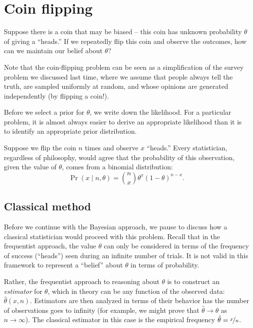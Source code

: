 \documentclass{article}
\newcommand{\given}{\mid}
\begin{document}
\section*{Coin flipping}

Suppose there is a coin that may be biased -- this coin has unknown
probability $\theta$ of giving a ``heads.''  If we repeatedly flip
this coin and observe the outcomes, how can we maintain our belief
about $\theta$?

Note that the coin-flipping problem can be seen as a simplification of
the survey problem we discussed last time, where we assume that people
always tell the truth, are sampled uniformly at random, and whose
opinions are generated independently (by flipping a coin!).

Before we select a prior for $\theta$, we write down the likelihood.
For a particular problem, it is almost always easier to derive an
appropriate likelihood than it is to identify an appropriate prior
distribution.

Suppose we flip the coin $n$ times and observe $x$ ``heads.''  Every
statistician, regardless of philosophy, would agree that the
probability of this observation, given the value of $\theta$, comes
from a binomial distribution:
\begin{equation*}
  \Pr(x \given n, \theta)
  =
  \binom{n}{x} \theta^x (1 - \theta)^{n - x}.
\end{equation*}

\subsection*{Classical method}

Before we continue with the Bayesian approach, we pause to discuss how
a classical statistician would proceed with this problem.  Recall that
in the frequentist approach, the value $\theta$ can only be considered
in terms of the frequency of success (``heads'') seen during an
infinite number of trials.  It is not valid in this framework to represent
a ``belief'' about $\theta$ in terms of probability.

Rather, the frequentist approach to reasoning about $\theta$ is to
construct an \emph{estimator} for $\theta$, which in theory can be any
function of the observed data: $\hat{\theta}(x, n)$.  Estimators are
then analyzed in terms of their behavior has the number of
observations goes to infinity (for example, we might prove that
$\hat{\theta} \to \theta$ as $n \to \infty$).  The classical estimator
in this case is the empirical frequency $\hat{\theta} =
\nicefrac{x}{n}$.
\end{document}
